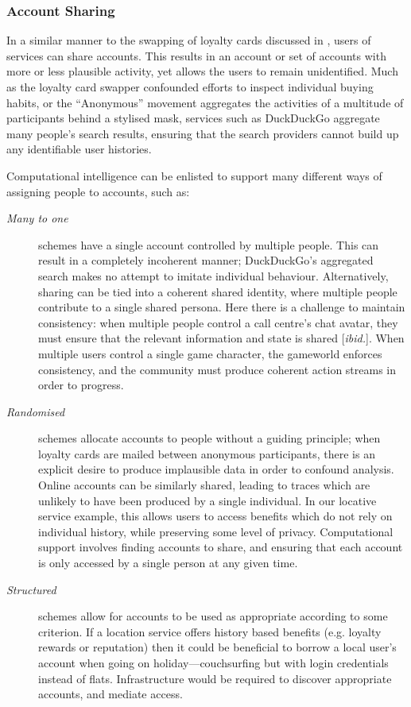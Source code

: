 \documentclass{IOS-Book-Article}     %
\newcommand{\tbox}[3][red]{{
\color{#1}\noindent{
   \fbox{\scriptsize{ {\bf #2} \textsl{#3}}}
   \vspace{2pt}
}
}}
\newcommand{\todo}[1]{\tbox{TODO:}{#1}}
\begin{document}
\subsubsection{Account Sharing}

In a similar manner to the swapping of loyalty cards discussed in
\cite{brunton2011vernacular}, users of services can share accounts. This
results in an account or set of accounts with more or less plausible activity,
yet allows the users to remain unidentified. 
Much as the loyalty card swapper confounded efforts to inspect individual
buying habits, or the ``Anonymous'' movement aggregates the activities of a
multitude of participants behind a stylised mask, services such as DuckDuckGo
aggregate many people's search results, ensuring that the search providers
cannot build up any identifiable user histories. 

Computational intelligence can be enlisted to support many different ways of assigning people to accounts,
 such as:
\begin{description}
  \item[\emph{Many to one}] schemes have a single account controlled by
  multiple people. This can result in a completely incoherent manner;
  DuckDuckGo's aggregated search makes no attempt to imitate
  individual behaviour. 
  Alternatively, sharing can be tied into a coherent shared identity,
   where multiple people contribute to a single shared persona\cite{dalton2013Pseudonymity}. 
   Here there is a challenge to maintain consistency: when multiple people
   control a call centre's chat avatar, they must ensure that the relevant
   information and state is shared [\emph{ibid.}]. When multiple users control a
   single game character, the gameworld enforces consistency, and the community
   must produce coherent action streams in order to progress.
   \item[\emph{Randomised}] schemes allocate accounts to people without a
   guiding principle; when loyalty cards are mailed between anonymous
   participants, there is an explicit desire to produce implausible data in
   order to confound analysis. Online accounts can be similarly shared, leading
   to traces which are unlikely to have been produced by a single individual.
   In our locative service example, this allows users to access benefits which
   do not rely on individual history, while preserving some level of privacy.
   Computational support involves finding accounts to share, and ensuring that
   each account is only accessed by a single person at any given time.
   \item[\emph{Structured}] schemes allow for accounts to be used as appropriate
   according to some criterion. If a location service offers history based
   benefits (e.g. loyalty rewards or reputation) then it could be beneficial to
   borrow a local user's account when going on holiday---couchsurfing but with
   login credentials instead of flats. Infrastructure would be required to
   discover appropriate accounts, and mediate access. 
\end{description}
\end{document}
